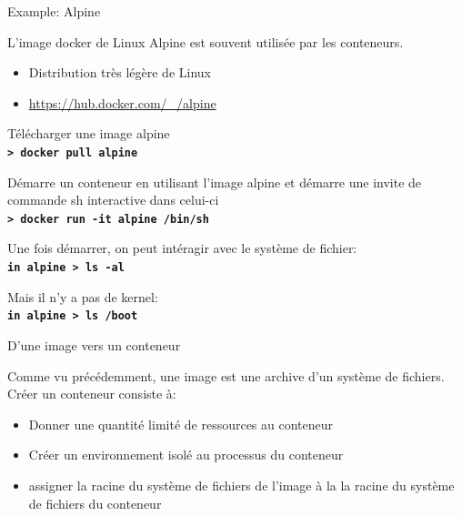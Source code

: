 \documentclass[aspectratio=169,10pt]{beamer}
\begin{document}

\begin{frame}{Example: Alpine}

L'image docker de Linux Alpine est souvent utilisée par les conteneurs.
\begin{itemize}
   \item Distribution très légère de Linux
   \item \url{https://hub.docker.com/_/alpine}
\end{itemize} 

Télécharger une image alpine \\
\texttt{\textbf{> docker pull alpine}}

Démarre un conteneur en utilisant l'image alpine et démarre une invite de commande sh interactive dans celui-ci
 \\
\texttt{\textbf{> docker run -it alpine /bin/sh}}

Une fois démarrer, on peut intéragir avec le système de fichier:
 \\
\texttt{\textbf{\alert{in alpine} > ls -al}}

Mais il n'y a pas de kernel:
 \\
\texttt{\textbf{\alert{in alpine} > ls /boot}}

\end{frame}

\begin{frame}{D'une image vers un conteneur}

Comme vu précédemment, une image est une archive d'un système de fichiers. Créer un conteneur consiste à:
\begin{itemize}
    \item Donner une \alert{quantité limité de ressources} au conteneur
    \item Créer un environnement isolé au processus du conteneur
    \item assigner la racine du système de fichiers de l'image à la \alert{la racine du système de fichiers du conteneur}
\end{itemize}

\end{frame}

\end{document}
